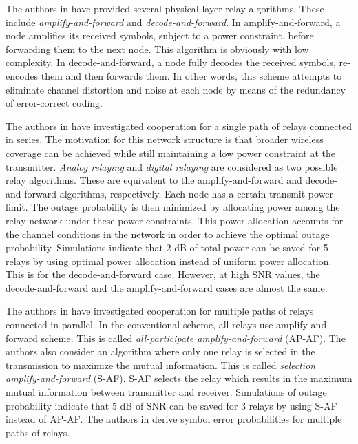 \documentclass[journal]{IEEEtran}
\begin{document}
The authors in \cite{thesis:Laneman01,article:Laneman01,article:Laneman02} have provided several physical layer relay algorithms.  These include \emph{amplify-and-forward} and \emph{decode-and-forward}.  In amplify-and-forward, a node amplifies its received symbols, subject to a power constraint, before forwarding them to the next node.  This algorithm is obviously with low complexity.  In decode-and-forward, a node fully decodes the received symbols, re-encodes them and then forwards them.  In other words, this scheme attempts to eliminate channel distortion and noise at each node by means of the redundancy of error-correct coding.

The authors in \cite{article:Hasna02,article:Hasna01} have investigated cooperation for a single path of relays connected in series.  The motivation for this network structure is that broader wireless coverage can be achieved while still maintaining a low power constraint at the transmitter.   \emph{Analog relaying} and \emph{digital relaying} are considered as two possible relay algorithms.  These are equivalent to the amplify-and-forward and decode-and-forward algorithms, respectively.  Each node has a certain transmit power limit.  The outage probability is then minimized by allocating power among the relay network under these power constraints.  This power allocation accounts for the channel conditions in the network in order to achieve the optimal outage probability.  Simulations indicate that $2$ dB of total power can be saved for 5 relays by using optimal power allocation instead of uniform power allocation.  This is for the decode-and-forward case.  However, at high $\mbox{SNR}$ values, the decode-and-forward and the amplify-and-forward cases are almost the same.

The authors in \cite{article:Adve01} have investigated cooperation for multiple paths of relays connected in parallel.  In the conventional scheme, all relays use amplify-and-forward scheme.  This is called \emph{all-participate amplify-and-forward} (AP-AF).  The authors also consider an algorithm where only one relay is selected in the transmission to maximize the mutual information.  This is called \emph{selection amplify-and-forward} (S-AF).  S-AF selects the relay which results in the maximum mutual information between transmitter and receiver.  Simulations of outage probability indicate that $5$ dB of SNR can be saved for 3 relays by using S-AF instead of AP-AF.  The authors in \cite{article:Ribeiro01} derive symbol error probabilities for multiple paths of relays.
\end{document}
